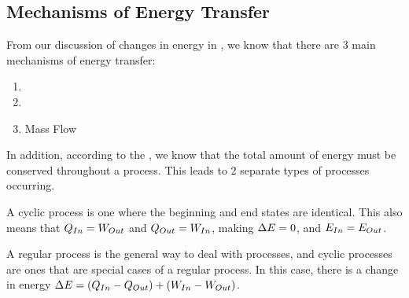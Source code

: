 \subsection{Mechanisms of Energy Transfer}\label{subsec:Mechanisms_Energy_Transfer}
From our discussion of changes in energy in , we know that there are 3 main mechanisms of energy transfer:
\begin{enumerate}[noitemsep]
\item {}
\item {}
\item Mass Flow
\end{enumerate}

In addition, according to the , we know that the total amount of energy must be conserved throughout a process.
This leads to 2 separate types of processes occurring.
\begin{description}[noitemsep]
\item[Cyclical] A cyclic process is one where the beginning and end states are identical.
  This also means that $Q_{In} = W_{Out}$ and $Q_{Out} = W_{In}$, making $\Delta E = 0$, and $E_{In} = E_{Out}$.
\item[Regular] A regular process is the general way to deal with processes, and cyclic processes are ones that are special cases of a regular process.
  In this case, there is a change in energy $\Delta E = (Q_{In} - Q_{Out}) + (W_{In} - W_{Out})$.
\end{description}


